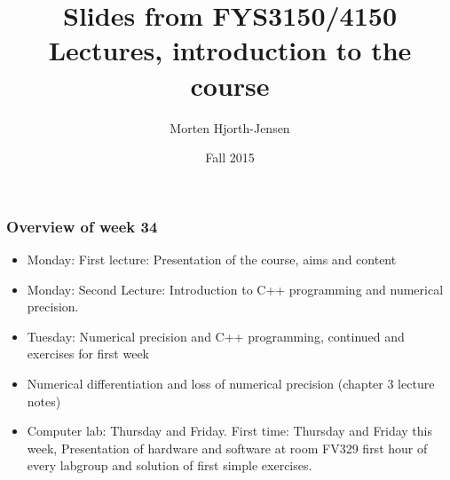 \documentclass{beamer}
\newenvironment{block_mdfboxadmon}[1][]{\begin{block}{#1}}{\end{block}}
\begin{document}




\title{Slides from FYS3150/4150 Lectures, introduction to the course}


\author{Morten Hjorth-Jensen}

\date{Fall 2015
}

\begin{frame}
\titlepage
\end{frame}

\begin{frame}
\frametitle{Overview of week 34}

\begin{block_mdfboxadmon}[]
\begin{itemize}
  \item Monday: First lecture: Presentation of the course, aims and content

  \item Monday: Second Lecture: Introduction to C++ programming and numerical precision.

  \item Tuesday: Numerical precision and C++ programming, continued and exercises for first week

  \item Numerical differentiation and loss of numerical precision (chapter 3 lecture notes)

  \item Computer lab: Thursday and Friday. First time: Thursday and Friday this week, Presentation of hardware and software at room FV329 first hour of every labgroup and solution of first simple exercises.
\end{itemize}

\noindent
\end{block_mdfboxadmon}
\end{frame}
\end{document}
